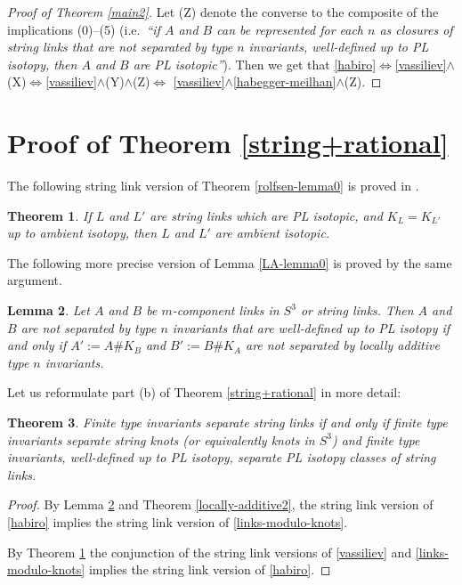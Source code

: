 \documentclass[a4paper,12pt,reqno,oneside]{amsart} %
\theoremstyle{plain}
\newtheorem{theorem}{Theorem}[section]
\newtheorem{lemma}[theorem]{Lemma}
\theoremstyle{definition}
\theoremstyle{named}
\renewcommand{\:}{\colon}
\begin{document}
\begin{proof}[Proof of Theorem \ref{main2}]
Let (Z) denote the converse to the composite of the implications (0)--(5) (i.e.\ {\it ``if $A$ and $B$ can be represented for each $n$ 
as closures of string links that are not separated by type $n$ invariants, well-defined up to PL isotopy, then $A$ and $B$ are 
PL isotopic''}).
Then we get that 
\ref{habiro}$\Leftrightarrow$\ref{vassiliev}$\land$(X)$\Leftrightarrow$\ref{vassiliev}$\land$(Y)$\land$(Z)$\Leftrightarrow$
\ref{vassiliev}$\land$\ref{habegger-meilhan}$\land$(Z).
\end{proof}


\section{Proof of Theorem \ref{string+rational}} \label{proofs3}

The following string link version of Theorem \ref{rolfsen-lemma0} is proved in \cite{M24-1'}.

\begin{theorem} \cite{M24-1'} \label{rolfsen-lemma0'} If $L$ and $L'$ are string links which are PL isotopic,
and $K_L=K_{L'}$ up to ambient isotopy, then $L$ and $L'$ are ambient isotopic.
\end{theorem}

The following more precise version of Lemma \ref{LA-lemma0} is proved by the same argument.

\begin{lemma} \label{LA-lemma3}
Let $A$ and $B$ be $m$-component links in $S^3$ or string links.
Then $A$ and $B$ are not separated by type $n$ invariants that are well-defined up to PL isotopy
if and only if $A':=A\#K_B$ and $B':=B\#K_A$ are not separated by locally additive type $n$ invariants.
\end{lemma}

Let us reformulate part (b) of Theorem \ref{string+rational} in more detail:

\begin{theorem}\label{string} 
Finite type invariants separate string links if and only if finite type invariants separate string knots (or equivalently knots in $S^3$)
and finite type invariants, well-defined up to PL isotopy, separate PL isotopy classes of string links.
\end{theorem}

\begin{proof}
By Lemma \ref{LA-lemma3} and Theorem \ref{locally-additive2}, the string link version of \ref{habiro} implies 
the string link version of \ref{links-modulo-knots}.

By Theorem \ref{rolfsen-lemma0'} the conjunction of the string link versions of \ref{vassiliev} and \ref{links-modulo-knots} implies
the string link version of \ref{habiro}.
\end{proof}
\end{document}
